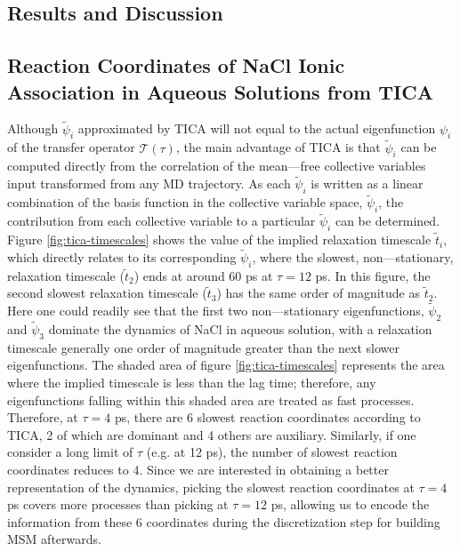 \begin{spacing}{2.0}
    \section{Results and Discussion}

    \subsection{Reaction Coordinates of NaCl Ionic Association in Aqueous Solutions from TICA}
    \label{ssec:tica-results}

    Although $\tilde{\psi}_i$ approximated by TICA will not equal to the actual eigenfunction $\psi_i$ of the transfer operator $\mathcal{T}(\tau)$, 
    the main advantage of TICA is that $\tilde{\psi}_i$ can be computed directly from the correlation of the mean—free collective variables input 
    transformed from any MD trajectory. As each $\tilde{\psi}_i$ is written as a linear combination of the basis function in the collective variable 
    space, $\tilde{\psi}_i$, the contribution from each collective variable to a particular $\tilde{\psi}_i$ can be determined. Figure 
    \ref{fig:tica-timescales} shows the value of the implied relaxation timescale $\tilde{t}_i$, which directly relates to its corresponding 
    $\tilde{\psi}_i$, where the slowest, non—stationary, relaxation timescale ($\tilde{t}_2$) ends at around 60 ps at $\tau = 12$ ps. In this 
    figure, the second slowest relaxation timescale ($\tilde{t}_3$) has the same order of magnitude as $\tilde{t}_2$. Here one could readily see 
    that the first two non—stationary eigenfunctions, $\tilde{\psi}_2$ and $\tilde{\psi}_3$ dominate the dynamics of NaCl in aqueous solution, 
    with a relaxation timescale generally one order of magnitude greater than the next slower eigenfunctions. The shaded area of figure 
    \ref{fig:tica-timescales} represents the area where the implied timescale is less than the lag time; therefore, any eigenfunctions falling 
    within this shaded area are treated as fast processes. Therefore, at $\tau = 4$ ps, there are 6 slowest reaction coordinates according to TICA, 
    2 of which are dominant and 4 others are auxiliary. Similarly, if one consider a long limit of $\tau$ (e.g. at 12 ps), the number of slowest 
    reaction coordinates reduces to 4. Since we are interested in obtaining a better representation of the dynamics, picking the slowest reaction 
    coordinates at $\tau = 4$ ps covers more processes than picking at $\tau = 12$ ps, allowing us to encode the information from these 6 coordinates 
    during the discretization step for building MSM afterwards.


\end{spacing}
